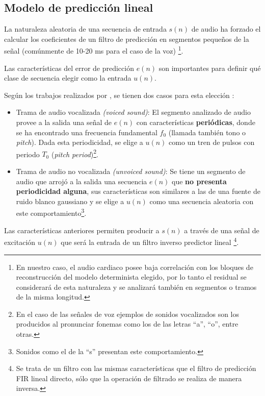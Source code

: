 
\subsection{Modelo de predicción lineal}
La naturaleza aleatoria de una secuencia de entrada $s(n)$  de audio ha forzado el calcular los coeficientes de un filtro de predicción en segmentos pequeños de la señal (comúnmente de 10-20 ms para el caso de la voz) \footnote{En nuestro caso, el audio cardiaco posee baja correlación con los bloques de reconstrucción del modelo determinista elegido, por lo tanto el residual se considerará de esta naturaleza y se analizará también en segmentos o tramos de la misma longitud.}.

Las características del error de predicción $e(n)$ son importantes para definir qué clase de secuencia elegir como la entrada $u(n)$.

Según los trabajos realizados por \cite{Rabiner1978}, se tienen dos casos para esta elección :
\begin{itemize}
	\item{Trama de audio vocalizada \emph{(voiced sound)}}: El segmento analizado de audio provee a la salida una señal de $e(n)$ 		con características \textbf{periódicas}, donde se ha encontrado una frecuencia fundamental $f_0$ (llamada también tono o 		\emph{pitch}). Dada esta  periodicidad, se elige a $u(n)$ como un tren de pulsos con periodo $T_0$ (\emph{pitch period})\footnote{En el caso de las 		señales de voz ejemplos de sonidos vocalizados son los producidos al pronunciar fonemas como los de las letras ``a'', ``o'', entre 		otras.}.  
	\item{Trama de audio no vocalizada \emph{(unvoiced sound)}}: Se tiene un segmento de audio que arrojó a la salida una secuencia $e(n)$ 		que \textbf{no presenta periodicidad alguna}, sus características son similares a las de una fuente de ruido blanco gaussiano y se elige a $u(n)$ como una secuencia aleatoria con este comportamiento\footnote{Sonidos como el de la ``s''  presentan este comportamiento.}.
\end{itemize}

Las características anteriores permiten producir a $s(n)$ a través de una señal de excitación $u(n)$  que será la entrada de un filtro inverso predictor  lineal \footnote{Se trata de un filtro con las mismas características que el filtro de predicción FIR lineal directo, sólo que la operación de filtrado se realiza de manera inversa.}. 


